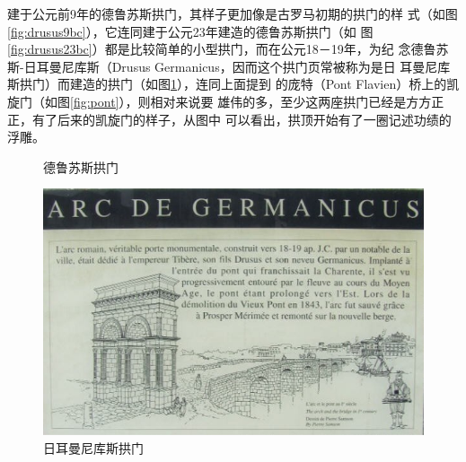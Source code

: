 \documentclass[a4paper,dvipdfm]{article}
\begin{document}
建于公元前9年的德鲁苏斯拱门，其样子更加像是古罗马初期的拱门的样
式（如图\ref{fig:drusus9bc}），它连同建于公元23年建造的德鲁苏斯拱门（如
图\ref{fig:drusus23bc}）都是比较简单的小型拱门，而在公元18－19年，为纪
念德鲁苏斯-日耳曼尼库斯（Drusus Germanicus，因而这个拱门页常被称为是日
耳曼尼库斯拱门）而建造的拱门（如图\ref{fig:germanicus}），连同上面提到
的庞特（Pont Flavien）桥上的凯旋门（如图\ref{fig:pont}），则相对来说要
雄伟的多，至少这两座拱门已经是方方正正，有了后来的凯旋门的样子，从图中
可以看出，拱顶开始有了一圈记述功绩的浮雕。

\begin{figure}[hbt!]
  \centering
  \caption{德鲁苏斯拱门}
\end{figure}

\begin{figure}[hbt!]
  \centering
  \includegraphics[width=\textwidth]{ArchOfDrusus_of_Germanicus}
  \caption{日耳曼尼库斯拱门}
  \label{fig:germanicus}
\end{figure}
\end{document}
